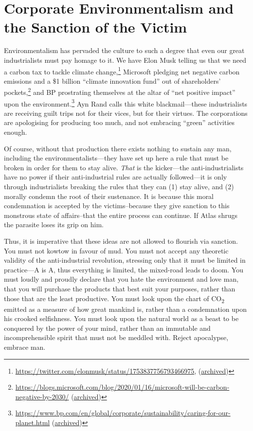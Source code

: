 \documentclass[11pt]{article}
\begin{document}
\section{Corporate Environmentalism and the Sanction of the Victim}
\label{sec:orgf2e1f00}
Environmentalism has pervaded the culture to such a degree that even our great industrialists must pay homage to it. We have Elon Musk telling us that we need a carbon tax to tackle climate change,\footnote{\url{https://twitter.com/elonmusk/status/1753837756793466975}, (\href{https://archive.ph/17E7w}{archived})} Microsoft pledging net negative carbon emissions and a \$1 billion ``climate innovation fund'' out of shareholders' pockets,\footnote{\url{https://blogs.microsoft.com/blog/2020/01/16/microsoft-will-be-carbon-negative-by-2030/} (\href{https://archive.ph/YDI73}{archived})} and BP prostrating themselves at the altar of ``net positive impact'' upon the environment.\footnote{\url{https://www.bp.com/en/global/corporate/sustainability/caring-for-our-planet.html} (\href{https://archive.ph/RpzT7}{archived})} Ayn Rand calls this white blackmail---these industrialists are receiving guilt trips not for their vices, but for their virtues. The corporations are apologising for producing too much, and not embracing ``green'' activities enough.

Of course, without that production there exists nothing to sustain any man, including the environmentalists---they have set up here a rule that must be broken in order for them to stay alive. \emph{That} is the kicker---the anti-industrialists have no power if their anti-industrial rules are actually followed---it is only through industrialists breaking the rules that they can (1) stay alive, and (2) morally condemn the root of their sustenance. It is because this moral condemnation is accepted by the victims--because they give sanction to this monstrous state of affairs--that the entire process can continue. If Atlas shrugs the parasite loses its grip on him.

Thus, it is imperative that these ideas are not allowed to flourish via sanction. You must not kowtow in favour of mud. You must not accept any theoretic validity of the anti-industrial revolution, stressing only that it must be limited in practice---A is A, thus everything is limited, the mixed-road leads to doom. You must loudly and proudly declare that you hate the environment and love man, that you will purchase the products that best suit your purposes, rather than those that are the least productive. You must look upon the chart of CO\textsubscript{2} emitted as a measure of how great mankind is, rather than a condemnation upon his crooked selfishness. You must look upon the natural world as a beast to be conquered by the power of your mind, rather than an immutable and incomprehensible spirit that must not be meddled with. Reject apocalypse, embrace man.
\end{document}
